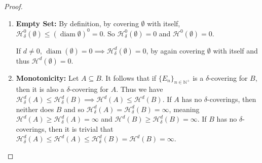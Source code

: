 \documentclass{article}
\theoremstyle{plain}
\theoremstyle{definition}
\DeclareMathOperator{\diam}{diam}
\theoremstyle{remark}
\begin{document}
\begin{proof} $ $
    \begin{enumerate}
        \item \textbf{Empty Set:} By definition, by covering $\emptyset$ with itself, $\mathcal{H}^0_\delta (\emptyset) \le (\diam \emptyset)^0=0$. So $\mathcal{H}^0_\delta (\emptyset)=0$ and $\mathcal{H}^0(\emptyset)=0$.
        
         If $d \ne 0$, $\diam (\emptyset)=0 \implies \mathcal{H}^d_\delta(\emptyset)=0$, by again covering $\emptyset $ with itself and thus $\mathcal{H}^d(\emptyset)=0$.
        \item \textbf{Monotonicity:} Let $A \subseteq B$. It follows that if $\{E_n\}_{n\in \mathbb{N}^+}$ is a $\delta$-covering for $B$, then it is also a $\delta$-covering for $A$. Thus we have $\mathcal{H}_\delta ^d(A) \le \mathcal{H}_\delta ^d(B) \implies \mathcal{H} ^d(A) \le \mathcal{H} ^d(B)$. If $A$ has no $\delta$-coverings, then neither does $B$ and so $\mathcal{H}^d_\delta  (A)=\mathcal{H}^d _\delta (B)=\infty$, meaning $\mathcal{H}^d(A) \ge \mathcal{H}^d_\delta (A)=\infty$ and $\mathcal{H}^d(B)\ge \mathcal{H}^d_\delta (B)=\infty$. If $B$ has no $\delta$-coverings, then it is trivial that $\mathcal{H} ^d_\delta (A)\le \mathcal{H}^d(A)\le \mathcal{H}^d_\delta (B) = \mathcal{H}^d(B)=\infty$.
        

\end{enumerate}
\end{proof}
\end{document}
